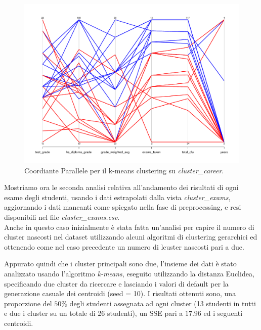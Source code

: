 \documentclass[]{article}
\begin{document}
\begin{figure}[!]
	\centering
	\includegraphics[scale=0.45]{Img/parallel_coord_career.pdf}
	\caption{Coordiante Parallele per il k-means clustering su \textit{cluster\_career}.
		\label{fig:9}}
\end{figure} 

Mostriamo ora le seconda analisi relativa all'andamento dei risultati di ogni esame degli studenti, usando i dati estrapolati dalla vista \textit{cluster\_exams}, aggiornando i dati mancanti come spiegato nella fase di preprocessing, e resi disponibili nel file \textit{cluster\_exams.csv}.\\

Anche in questo caso inizialmente \`{e} stata fatta un'analisi per capire il numero di cluster nascosti nel dataset utilizzando alcuni algoritmi di clustering gerarchici ed ottenendo come nel caso precedente un numero di lcuster nascosti pari a due. 

Appurato quindi che i cluster principali sono due, l'insieme dei dati \`{e} stato analizzato usando l'algoritmo \textit{k-means}, eseguito utilizzando la distanza Euclidea, specificando due cluster da ricercare e lasciando i valori di default per la generazione casuale dei centroidi (seed = 10). I risultati ottenuti sono, una proporzione del $50\%$ degli studenti assegnata ad ogni cluster (13 studenti in tutti e due i cluster su un totale di 26 studenti), un SSE pari a $17.96$ ed i seguenti centroidi.

\begin{center}
\end{center}
\end{document}
